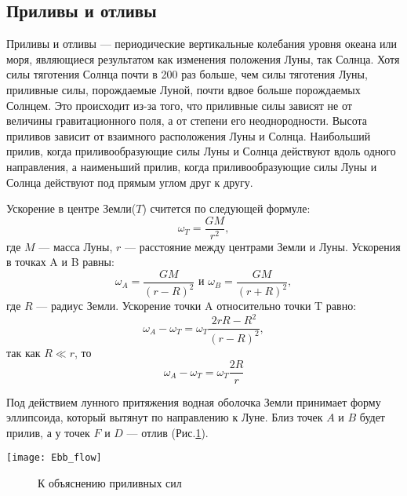 \subsection{Приливы и отливы}

Приливы и отливы --- периодические вертикальные колебания уровня океана или моря, являющиеся результатом как изменения положения Луны, так Солнца. Хотя силы тяготения Солнца почти в 200 раз больше, чем силы тяготения Луны, приливные силы, порождаемые Луной, почти вдвое больше порождаемых Солнцем. Это происходит из-за того, что приливные силы зависят не от величины гравитационного поля, а от степени его неоднородности. Высота приливов зависит от взаимного расположения Луны и Солнца. Наибольший прилив, когда приливообразующие силы Луны и Солнца действуют вдоль одного направления, а наименьший прилив, когда приливообразующие силы Луны и Солнца действуют под прямым углом друг к другу.

Ускорение в центре Земли($T$) считется по следующей формуле: \begin{equation}\omega_T=\frac{GM}{r^2},
\end{equation}
где $M$ --- масса Луны, $r$ --- расстояние между центрами Земли и Луны. Ускорения в точках A и B равны:
\begin{equation}\omega_A=\frac{GM}{(r-R)^2} \text{ и } \omega_B=\frac{GM}{(r+R)^2},
\end{equation}
где $R$ --- радиус Земли. Ускорение точки A относительно точки T равно:
\begin{equation}\omega_A-\omega_T=\omega_T\frac{2rR-R^2}{(r-R)^2},
\end{equation}
так как $R\ll r$, то \begin{equation}\omega_A-\omega_T=\omega_T\frac{2R}{r}
\end{equation}

Под действием лунного притяжения водная оболочка Земли принимает форму эллипсоида, который вытянут по направлению к Луне. Близ точек $A$ и $B$ будет прилив, а у точек $F$ и $D$ --- отлив (Рис.\ref{Ebb_flow}).
\begin{center}
\texttt{[image: Ebb\_flow]}
\begin{figure}[h!]
\caption{К объяснению приливных сил}\label{Ebb_flow}
\end{figure}
\end{center}
